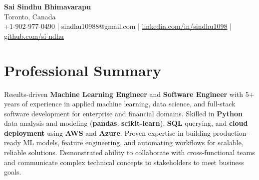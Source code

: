\documentclass[letterpaper,11pt]{article}
\begin{document}
\begin{center}
  {\Large \textbf{Sai Sindhu Bhimavarapu}} \\
  Toronto, Canada \\
  +1-902-977-0490 \enspace | \enspace sindhu10988@gmail.com \enspace | \enspace \href{https://www.linkedin.com/in/sindhu1098/}{linkedin.com/in/sindhu1098} \enspace | \enspace \href{https://github.com/si-ndhu}{github.com/si-ndhu}
\end{center}

\section{Professional Summary}
  \begin{itemize}[leftmargin=0.15in, label={}]
    \small{\item{
     Results-driven \textbf{Machine Learning Engineer} and \textbf{Software Engineer} with 5+ years of experience in applied machine learning, data science, and full-stack software development for enterprise and financial domains. Skilled in \textbf{Python} data analysis and modeling (\textbf{pandas}, \textbf{scikit-learn}), \textbf{SQL} querying, and \textbf{cloud deployment} using \textbf{AWS} and \textbf{Azure}. Proven expertise in building production-ready ML models, feature engineering, and automating workflows for scalable, reliable solutions. Demonstrated ability to collaborate with cross-functional teams and communicate complex technical concepts to stakeholders to meet business goals.
    }}
  \end{itemize}
\vspace{-16pt}

\end{document}
